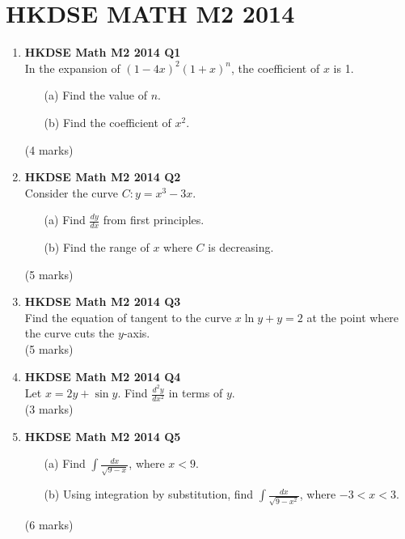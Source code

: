 \documentclass{report}
\begin{document}
\chapter{HKDSE MATH M2 2014}
\begin{enumerate}
	\item \textbf{HKDSE Math M2 2014 Q1}\\
	In the expansion of $(1-4x)^2(1+x)^n$, the coefficient of $x$ is 1.
	\begin{enumerate}
		\item [(a)]Find the value of $n$. 
		\item [(b)]Find the coefficient of $x^2$. 
	\end{enumerate}
	(4 marks)

	\item \textbf{HKDSE Math M2 2014 Q2}\\
	Consider the curve $C : y = x^3-3x$. 
	\begin{enumerate}
		\item [(a)]Find $\displaystyle\frac{dy}{dx}$ from  first principles. 
		\item [(b)]Find the range of $x$ where $C$ is decreasing.
	\end{enumerate}
	(5 marks)

	\item \textbf{HKDSE Math M2 2014 Q3}\\
	Find the equation of tangent to the curve $x\ln{y} + y = 2$ at the point where the curve cuts the $y$-axis.\\
	(5 marks)

	\item \textbf{HKDSE Math M2 2014 Q4}\\
	Let $x = 2y + \sin{y}$. Find $\displaystyle\frac{d^2y}{dx^2}$ in terms of $y$.\\(3 marks)

	\item \textbf{HKDSE Math M2 2014 Q5}
	\begin{enumerate}
		\item [(a)]Find $\displaystyle\int \frac{dx}{\sqrt{9-x}}$, where $x < 9$. 
		\item [(b)]Using integration by substitution, find $\displaystyle\int \frac{dx}{\sqrt{9-x^2}}$, where $-3 < x < 3$.
	\end{enumerate}
	(6 marks)

	\newpage


\end{enumerate}
\end{document}
